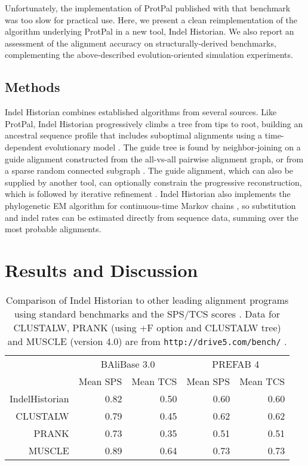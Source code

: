 \documentclass{bioinfo}
\begin{document}
Unfortunately, the implementation of ProtPal published with that benchmark was too slow
for practical use.
Here, we present a clean reimplementation of the algorithm underlying ProtPal
in a new tool, Indel Historian.
We also report an assessment of the alignment accuracy
on structurally-derived benchmarks,
complementing the above-described evolution-oriented simulation experiments.

\begin{methods}
\section{Methods}

Indel Historian combines established algorithms from several sources.
Like ProtPal, Indel Historian progressively climbs a tree from tips to root,
building an ancestral sequence profile that includes suboptimal alignments \citep{LeeGrassoSharlow2002,Westesson2012-zg}
using a time-dependent evolutionary model \citep{RivasEddy2015}.
The guide tree is found by neighbor-joining %
on a guide alignment constructed from the all-vs-all pairwise alignment graph,
or from a sparse random connected subgraph \citep{BradleyEtAl2009}.
The guide alignment, which can also be supplied by another tool,
can optionally constrain the progressive reconstruction,
which is followed by iterative refinement \citep{HolmesBruno2001,Edgar2004b}.
Indel Historian also implements the phylogenetic EM algorithm for continuous-time Markov chains \citep{HolmesRubin2002},
so substitution and indel rates can be estimated directly from sequence data,
summing over the most probable alignments.

\end{methods}

\section{Results and Discussion}

\begin{table}
  \begin{tabular}{r|rr|rr}
    & \multicolumn{2}{c|}{BAliBase 3.0} & \multicolumn{2}{c}{PREFAB 4} \\
    & Mean SPS & Mean TCS & Mean SPS & Mean TCS \\
    \hline
IndelHistorian & 0.82 & 0.50 & 0.60 & 0.60 \\
CLUSTALW & 0.79 & 0.45 & 0.62 & 0.62 \\
PRANK & 0.73 & 0.35 & 0.51 & 0.51 \\
MUSCLE & 0.89 & 0.64 & 0.73 & 0.73 \\
  \end{tabular}
  \caption{
    Comparison of Indel Historian to other leading alignment programs using standard benchmarks
    and the SPS/TCS scores \citep{ThompsonEtAl2005}.
    Data for CLUSTALW, PRANK (using +F option and CLUSTALW tree) and MUSCLE (version 4.0) are from {\tt http://drive5.com/bench/} \citep{Edgar2010}.
  }
\end{table}
\end{document}
